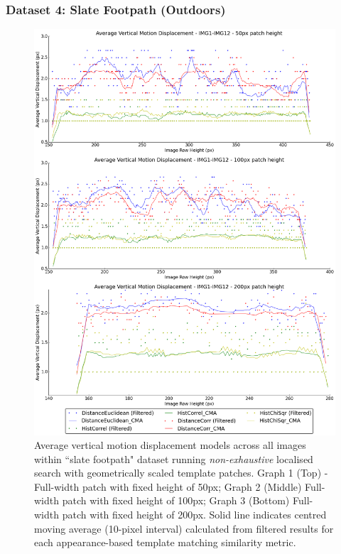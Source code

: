 \clearpage
\subsubsection{Dataset 4: Slate Footpath (Outdoors)}

\begin{figure}[ht!]
\centering
\includegraphics[scale=0.3]{images/results/path_outside_10cm_scaled}
\caption{Average vertical motion displacement models across all images within ``slate footpath" dataset running \textit{non-exhaustive} localised search with geometrically scaled template patches. Graph 1 (Top) - Full-width patch with fixed height of 50px; Graph 2 (Middle) Full-width patch with fixed height of 100px; Graph 3 (Bottom) Full-width patch with fixed height of 200px. Solid line indicates centred moving average (10-pixel interval) calculated from filtered results for each appearance-based template matching similarity metric.}
\label{fig:ex3_4_1}
\end{figure}

